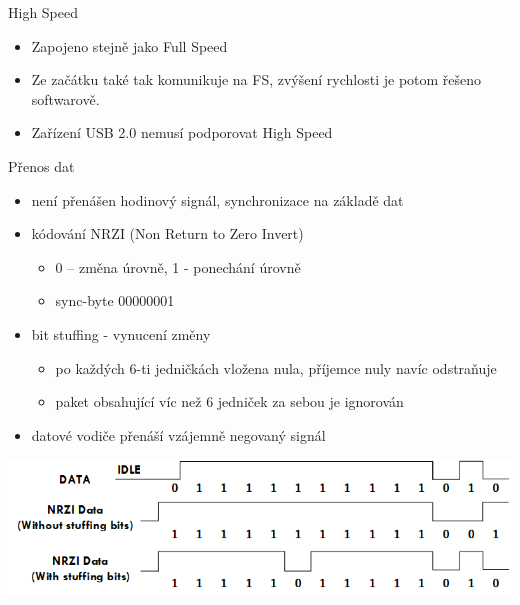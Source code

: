 \documentclass[aspectratio=43]{beamer}
\begin{document}
\begin{frame}{High Speed}
	\begin{itemize}
		\item Zapojeno stejně jako Full Speed 
		\item Ze začátku také tak komunikuje na FS, zvýšení rychlosti je 
		      potom řešeno softwarově.
		\item Zařízení USB 2.0 nemusí podporovat High Speed
	\end{itemize}
	
\end{frame}


\begin{frame}{Přenos dat}
	\begin{itemize}
		\item není přenášen hodinový signál, synchronizace na základě dat
		\item kódování NRZI (Non Return to Zero Invert)
		      \begin{itemize}
		      	\item 0 – změna úrovně, 1 - ponechání úrovně
		      	\item sync-byte 00000001
		      \end{itemize}
		\item bit stuffing - vynucení změny
		      \begin{itemize}
		      	\item po každých 6-ti jedničkách vložena nula, příjemce nuly navíc odstraňuje
		      	\item paket obsahující víc než 6 jedniček za sebou je  ignorován
		      \end{itemize}
		\item datové vodiče přenáší vzájemně negovaný signál
	\end{itemize}
	
	
	\begin{center}
		\includegraphics[width=1\linewidth]{extrahovane_obrazky/NRZI.png}
	\end{center}
\end{frame}
\end{document}
